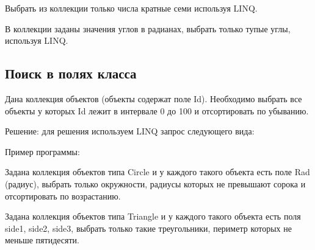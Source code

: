 \task Выбрать из коллекции только числа кратные семи используя LINQ.

\task В коллекции заданы значения углов в радианах, выбрать только
тупые углы, используя LINQ.


\subsection{Поиск в полях класса}

Дана коллекция объектов (объекты содержат поле Id). Необходимо выбрать
все объекты у которых Id лежит в интервале 0 до 100 и отсортировать по
убыванию.

Решение: для решения используем LINQ запрос следующего вида:


Пример программы:


        
        

\task Задана коллекция объектов типа Circle и у каждого такого объекта
есть поле Rad (радиус), выбрать только окружности, радиусы которых не
превышают сорока и отсортировать по возрастанию.

\task Задана коллекция объектов типа Triangle и у каждого такого объекта
есть поля side1, side2, side3, выбрать только такие треугольники,
периметр которых не меньше пятидесяти.

